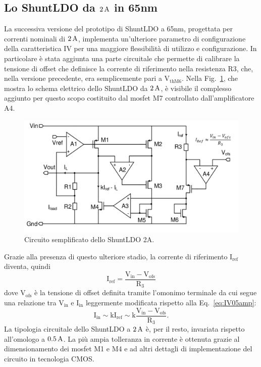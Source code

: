 \subsection{Lo ShuntLDO da $2\rm \, A$ in 65nm}
\label{SLDO2A}

La successiva versione del prototipo di ShuntLDO a 65nm, progettata per correnti nominali di $2\rm \, A$, implementa un'ulteriore parametro di configurazione della caratteristica IV per una maggiore flessibilit\`a di utilizzo e configurazione. In particolare \`e stata aggiunta una parte circuitale che permette di calibrare la tensione di offset che definisce la corrente di riferimento nella resistenza R3, che, nella versione precedente, era semplicemente pari a $\mathrm{V_{thM6}}$. Nella Fig.~\ref{SLDO2A}, che mostra lo schema elettrico dello ShuntLDO da $2\rm \, A$, \`e visibile il complesso aggiunto per questo scopo costituito dal mosfet M7 controllato dall'amplificatore A4.
\begin{figure}
\centering
\includegraphics[width=\linewidth]{Immagini/SLDO2A}
\caption{Circuito semplificato dello ShuntLDO 2A.}
\label{SLDO2A}
\end{figure}
Grazie alla presenza di questo ulteriore stadio, la corrente di riferimento $\mathrm{I_{ref}}$ diventa, quindi
\begin{equation}
\mathrm{I_{ref} = \frac{V_{in} - V_{ofs}}{R_3}}
\end{equation}
dove $\mathrm{V_{ofs}}$ \`e la tensione di offset definita tramite l'omonimo terminale da cui segue una relazione tra $\mathrm{V_{in}}$ e $\mathrm{I_{in}}$ leggermente modificata rispetto alla Eq.~\ref{eq:IV05amp}: 
\begin{equation}
\mathrm{I_{in} \sim k I_{ref} \sim k \frac{V_{in} - V_{ofs}}{R_3}}.
\end{equation}
La tipologia circuitale dello ShuntLDO a $2\rm \, A$ \`e, per il resto, invariata rispetto all'omologo a $0.5\rm \, A$. La pi\`u ampia tolleranza in corrente \`e ottenuta grazie al dimensionamento dei mosfet M1 e M4 e ad altri dettagli di implementazione del circuito in tecnologia CMOS.

